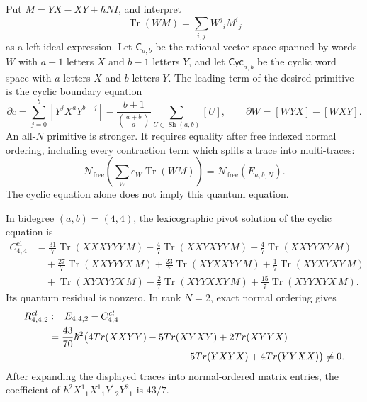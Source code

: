\begin{stmt}
\label{stmt:app-quantum-shear-trace-diagram-obstruction}
  Put \(M=YX-XY+\hbar N I\), and interpret
  \[
    \operatorname{Tr}(W M)=\sum_{i,j}W^j{}_iM^i{}_j
  \]
  as a left-ideal expression.  Let \(\mathsf C_{a,b}\) be the rational
  vector space spanned by words \(W\) with \(a-1\) letters \(X\) and
  \(b-1\) letters \(Y\), and let \(\mathsf{Cyc}_{a,b}\) be the cyclic
  word space with \(a\) letters \(X\) and \(b\) letters \(Y\).  The
  leading term of the desired primitive is the cyclic boundary equation
  \[
    \partial c=
    \sum_{j=0}^b[Y^jX^aY^{b-j}]
    -\frac{b+1}{\binom{a+b}{a}}
      \sum_{U\in \operatorname{Sh}(a,b)}[U],
    \qquad
    \partial W=[WYX]-[WXY].
  \]
  An all-\(N\) primitive is stronger.  It requires equality after free
  indexed normal ordering, including every contraction term which splits
  a trace into multi-traces:
  \[
    \mathcal N_{\mathrm{free}}\!\left(
      \sum_W c_W\operatorname{Tr}(W M)\right)
    =
    \mathcal N_{\mathrm{free}}(E_{a,b,N}).
  \]
  The cyclic equation alone does not imply this quantum equation.

  In bidegree \((a,b)=(4,4)\), the lexicographic pivot solution of the
  cyclic equation is
  \[
  \begin{aligned}
    C^{\mathrm{cl}}_{4,4}
    &=
      \frac{31}{7}\operatorname{Tr}(XXXYYY\,M)
      -\frac{4}{7}\operatorname{Tr}(XXYXYY\,M)
      -\frac{4}{7}\operatorname{Tr}(XXYYXY\,M)\\
    &\quad
      +\frac{27}{7}\operatorname{Tr}(XXYYYX\,M)
      +\frac{23}{7}\operatorname{Tr}(XYXXYY\,M)
      +\frac{1}{7}\operatorname{Tr}(XYXYXY\,M)\\
    &\quad
      +\operatorname{Tr}(XYXYYX\,M)
      -\frac{2}{7}\operatorname{Tr}(XYYXXY\,M)
      +\frac{15}{7}\operatorname{Tr}(XYYXYX\,M).
  \end{aligned}
  \]
  Its quantum residual is nonzero.  In rank \(N=2\), exact normal
  ordering gives
  \[
  \begin{aligned}
    R^{\mathrm{cl}}_{4,4,2}
    &:=
      E_{4,4,2}-C^{\mathrm{cl}}_{4,4}\\
    &=
      \frac{43}{70}\hbar^2\bigl(
        4\operatorname{Tr}(XXYY)-5\operatorname{Tr}(XYXY)
        +2\operatorname{Tr}(XYYX)\\
    &\hspace{4.6cm}
        -5\operatorname{Tr}(YXYX)
        +4\operatorname{Tr}(YYXX)
      \bigr)\neq0 .
  \end{aligned}
  \]
  After expanding the displayed traces into normal-ordered matrix
  entries, the coefficient of
  \(\hbar^2X^1{}_1X^1{}_1Y^1{}_2Y^2{}_1\) is \(43/7\).


\end{stmt}
